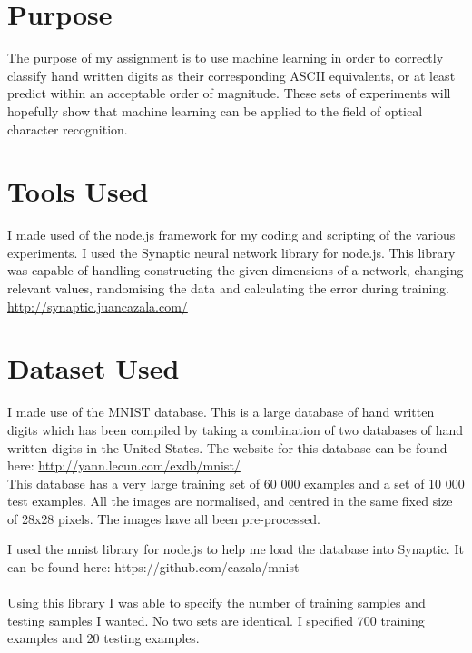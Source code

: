 \documentclass[11pt]{article}
\begin{document}
\begin{page}

\clearpage
\setcounter{page}{1}
\tableofcontents
\clearpage
{}

\section{Purpose}
The purpose of my assignment is to use machine learning in order to correctly classify hand written digits as their corresponding ASCII equivalents, or at least predict within an acceptable order of magnitude. These sets of experiments will hopefully show that machine learning can be applied to the field of optical character recognition.

\section{Tools Used}
I made used of the node.js framework for my coding and scripting of the various experiments. I used the Synaptic neural network library for node.js. This library was capable of handling constructing the given dimensions of a network, changing relevant values, randomising the data and calculating the error during training. \url{http://synaptic.juancazala.com/}

\section{Dataset Used}
I made use of the MNIST database. This is a large database of hand written digits which has been compiled by taking a combination of two databases of hand written digits in the United States. The website for this database can be found here: \url{http://yann.lecun.com/exdb/mnist/} \\

\noindent This database has a very large training set of 60 000 examples and a set of 10 000 test examples. All the images are normalised, and centred in the same fixed size of 28x28 pixels. The images have all been pre-processed.

\noindent I used the mnist library for node.js to help me load the database into Synaptic. It can be found here: https://github.com/cazala/mnist \\\\

\noindent Using this library I was able to specify the number of training samples and testing samples I wanted. No two sets are identical. I specified 700 training examples and 20 testing examples. \\\\


\end{page}
\end{document}
